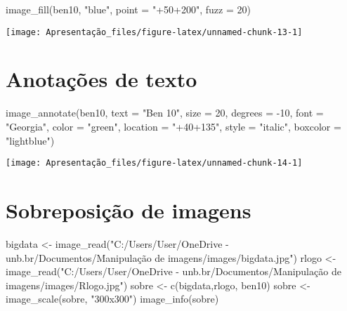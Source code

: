 \documentclass[
]{article}
\newenvironment{Shaded}{\begin{snugshade}}{\end{snugshade}}
\newcommand{\AttributeTok}[1]{\textcolor[rgb]{0.77,0.63,0.00}{#1}}
\newcommand{\DecValTok}[1]{\textcolor[rgb]{0.00,0.00,0.81}{#1}}
\newcommand{\FunctionTok}[1]{\textcolor[rgb]{0.00,0.00,0.00}{#1}}
\newcommand{\NormalTok}[1]{#1}
\newcommand{\OtherTok}[1]{\textcolor[rgb]{0.56,0.35,0.01}{#1}}
\newcommand{\SpecialCharTok}[1]{\textcolor[rgb]{0.00,0.00,0.00}{#1}}
\newcommand{\StringTok}[1]{\textcolor[rgb]{0.31,0.60,0.02}{#1}}
\begin{document}
\begin{Shaded}
\begin{Highlighting}[]
\FunctionTok{image\_fill}\NormalTok{(ben10, }\StringTok{"blue"}\NormalTok{, }\AttributeTok{point =} \StringTok{"+50+200"}\NormalTok{, }\AttributeTok{fuzz =} \DecValTok{20}\NormalTok{)}
\end{Highlighting}
\end{Shaded}

\texttt{[image: Apresentação\_files/figure-latex/unnamed-chunk-13-1]}

\hypertarget{anotauxe7uxf5es-de-texto}{%
\section{Anotações de texto}\label{anotauxe7uxf5es-de-texto}}

\begin{Shaded}
\begin{Highlighting}[]
\FunctionTok{image\_annotate}\NormalTok{(ben10, }\AttributeTok{text =} \StringTok{"Ben 10"}\NormalTok{, }\AttributeTok{size =} \DecValTok{20}\NormalTok{,}
               \AttributeTok{degrees =} \SpecialCharTok{{-}}\DecValTok{10}\NormalTok{, }\AttributeTok{font =} \StringTok{"Georgia"}\NormalTok{,}
               \AttributeTok{color =} \StringTok{"green"}\NormalTok{,}
               \AttributeTok{location =} \StringTok{"+40+135"}\NormalTok{,}
               \AttributeTok{style =} \StringTok{"italic"}\NormalTok{, }
               \AttributeTok{boxcolor =} \StringTok{"lightblue"}\NormalTok{)}
\end{Highlighting}
\end{Shaded}

\texttt{[image: Apresentação\_files/figure-latex/unnamed-chunk-14-1]}

\hypertarget{sobreposiuxe7uxe3o-de-imagens}{%
\section{Sobreposição de imagens}\label{sobreposiuxe7uxe3o-de-imagens}}

\begin{Shaded}
\begin{Highlighting}[]
\NormalTok{bigdata }\OtherTok{\textless{}{-}} \FunctionTok{image\_read}\NormalTok{(}\StringTok{"C:/Users/User/OneDrive {-} unb.br/Documentos/Manipulação de imagens/images/bigdata.jpg"}\NormalTok{)}
\NormalTok{rlogo }\OtherTok{\textless{}{-}} \FunctionTok{image\_read}\NormalTok{(}\StringTok{"C:/Users/User/OneDrive {-} unb.br/Documentos/Manipulação de imagens/images/Rlogo.jpg"}\NormalTok{)}
\NormalTok{sobre }\OtherTok{\textless{}{-}} \FunctionTok{c}\NormalTok{(bigdata,rlogo, ben10)}
\NormalTok{sobre }\OtherTok{\textless{}{-}} \FunctionTok{image\_scale}\NormalTok{(sobre, }\StringTok{"300x300"}\NormalTok{)}
\FunctionTok{image\_info}\NormalTok{(sobre)}
\end{Highlighting}
\end{Shaded}
\end{document}
